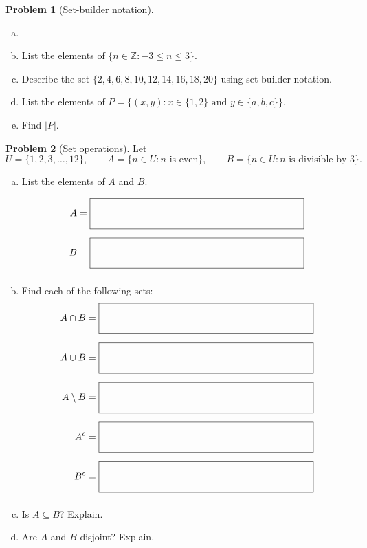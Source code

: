 \documentclass[10pt]{amsart}
\theoremstyle{definition}
\newtheorem{problem}{Problem}
\newcommand{\inlineanswerbox}[1][3in]{%
  \ensuremath{%
    \vcenter{\hbox{%
        \fbox{\rule{0pt}{0.35in}\hspace{#1}}%
      }}%
  }%
}
\begin{document}
\begin{problem}[Set-builder notation]
  \begin{enumerate}[(a)]
    \item[]
    \item List the elements of $\{n\in\mathbb Z:-3\leq n\leq 3\}.$
    \vspace{1in}

    \item Describe the set $\{2,4,6,8,10,12,14,16,18,20\}$ using set-builder notation.
    \vspace{1in}

    \item List the elements of $P=\{(x,y):x\in\{1,2\}\text{ and }y\in\{a,b,c\}\}$.
    \vspace{2in}

    \item Find $|P|$.
  \end{enumerate}
\end{problem}
\newpage
\begin{problem}[Set operations]
  Let
  \begin{equation*}
    U=\{1,2,3,\ldots,12\},
    \qquad
    A=\{n\in U:n\text{ is even}\},
    \qquad
    B=\{n\in U:n\text{ is divisible by }3\}.
  \end{equation*}

  \begin{enumerate}[(a)]
    \item List the elements of $A$ and $B$.

    \begin{align*}
      A &=\inlineanswerbox\\[0.5em]
      B &=\inlineanswerbox\\[0.5em]
    \end{align*}


    \item Find each of the following sets:
    \begin{align*}
      A\cap B      &=\inlineanswerbox\\[0.5em]
      A\cup B      &=\inlineanswerbox\\[0.5em]
      A\setminus B &=\inlineanswerbox\\[0.5em]
      A^{c} &=\inlineanswerbox\\[0.5em]
      B^{c} &=\inlineanswerbox\\[0.5em]
    \end{align*}

    \item Is $A\subseteq B$? Explain.
    \vspace{1in}

    \item Are $A$ and $B$ disjoint? Explain.
    \vspace{1in}

  \end{enumerate}
\end{problem}
\end{document}
